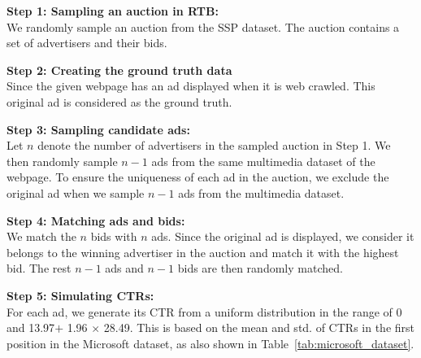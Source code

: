 \begin{algorithmic}[0]
\State \textbf{Step 1: Sampling an auction in RTB:}\\ 
We randomly sample an auction from the SSP dataset. The auction contains a set of advertisers and their bids. 

\State \textbf{Step 2: Creating the ground truth data}\\
Since the given webpage has an ad displayed when it is web crawled. This original ad is considered as the ground truth. 

\State \textbf{Step 3: Sampling candidate ads:}\\ 
Let $n$ denote the number of advertisers in the sampled auction in Step 1. We then randomly sample $n-1$ ads from the same multimedia dataset of the webpage. To ensure the uniqueness of each ad in the auction, we exclude the original ad when we sample $n-1$ ads from the multimedia dataset. 

\State \textbf{Step 4: Matching ads and bids:}\\ We match the $n$ bids with $n$ ads. Since the original ad is displayed, we consider it belongs to the winning advertiser in the auction and match it with the highest bid. The rest $n-1$ ads and $n-1$ bids are then randomly matched. 

\State \textbf{Step 5: Simulating CTRs:}\\ For each ad, we generate its CTR from a uniform distribution in the range of 0 and 13.97\textperthousand $+$ 1.96 $\times$ 28.49\textperthousand. This is based on the mean and std. of CTRs in the first position in the Microsoft dataset, as also shown in Table~\ref{tab:microsoft_dataset}.
\end{algorithmic}

